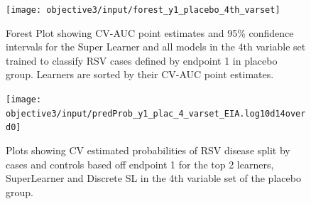 \documentclass[11pt]{article}
\begin{document}
\begin{figure}[H]
    \centering
    \texttt{[image: objective3/input/forest\_y1\_placebo\_4th\_varset]}
    \caption{Forest Plot showing CV-AUC point estimates and 95\% confidence intervals for the Super Learner and all models in the 4th variable set trained to classify RSV cases defined by endpoint 1 in placebo group. Learners are sorted by their CV-AUC point estimates.}
    \label{fig:forest_y1_placebo_chosenvarset}
    \end{figure}

\begin{figure}[H]
    \centering
    \texttt{[image: objective3/input/predProb\_y1\_plac\_4\_varset\_EIA.log10d14overd0]}
    \caption{Plots showing CV estimated probabilities of RSV disease split by cases and controls based off endpoint 1 for the top 2 learners, SuperLearner and Discrete SL in the 4th variable set of the placebo group.}
    \label{fig:predProb_y1_plac_chosenvarset}
    \end{figure}
\end{document}
